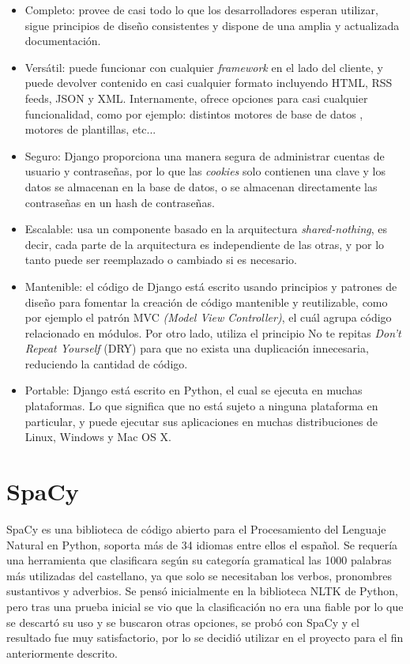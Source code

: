 \begin{itemize}
	\item Completo: provee de casi todo lo que los desarrolladores esperan utilizar, sigue principios de diseño consistentes y dispone de una amplia y actualizada documentación.
	\item Versátil: puede funcionar con cualquier \textit{framework} en el lado del cliente, y puede devolver contenido en casi cualquier formato incluyendo HTML, RSS feeds, JSON y XML. Internamente, ofrece opciones para casi cualquier funcionalidad, como por ejemplo: distintos motores de base de datos , motores de plantillas, etc...
	\item Seguro: Django proporciona una manera segura de administrar cuentas de usuario y contraseñas, por lo que las \textit{cookies} solo contienen una clave y los datos se almacenan en la base de datos, o se almacenan directamente las contraseñas en un hash de contraseñas.
	\item Escalable: usa un componente basado en la arquitectura \textit{shared-nothing}, es decir, cada parte de la arquitectura es independiente de las otras, y por lo tanto puede ser reemplazado o cambiado si es necesario.
	\item Mantenible: el código de Django está escrito usando principios y patrones de diseño para fomentar la creación de código mantenible y reutilizable, como por ejemplo el patrón MVC \textit{(Model View Controller)}, el cuál agrupa código relacionado en módulos.  Por otro lado, utiliza el principio No te repitas \textit{Don't Repeat Yourself} (DRY) para que no exista una duplicación innecesaria, reduciendo la cantidad de código. 
	\item Portable: Django está escrito en Python, el cual se ejecuta en muchas plataformas. Lo que significa que no está sujeto a ninguna plataforma en particular, y puede ejecutar sus aplicaciones en muchas distribuciones de Linux, Windows y Mac OS X.
\end{itemize}

\section{SpaCy}
\label{cap:sec:spacy}
SpaCy es una biblioteca de código abierto para el Procesamiento del Lenguaje Natural en Python, soporta más de 34 idiomas entre ellos el español. Se requería una herramienta que clasificara según su categoría gramatical las 1000 palabras más utilizadas del castellano, ya que solo se necesitaban los verbos, pronombres sustantivos y adverbios. Se pensó inicialmente en la biblioteca NLTK de Python, pero tras una prueba inicial se vio que la clasificación no era una fiable por lo que se descartó su uso y se buscaron otras opciones, se probó con SpaCy y el resultado fue muy satisfactorio, por lo se decidió utilizar en el proyecto para el fin anteriormente descrito.



